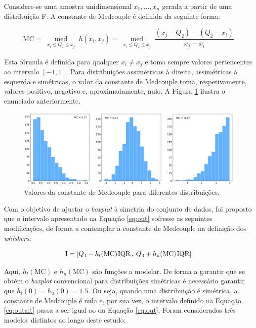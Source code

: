 Considere-se uma amostra unidimensional ${x_1, \dots, x_n}$ gerada a partir de uma distribuição F. A constante de Medcouple é definida da seguinte forma:


\begin{equation}
	\text{MC} = \operatorname*{med}_{\substack{x_i \leq Q_2 \leq x_j}} h(x_i, x_j) = \operatorname*{med}_{\substack{x_i \leq Q_2 \leq x_j}} \frac{(x_j - Q_2) - (Q_2 - x_i)}{x_j - x_i}
\end{equation}

Esta fórmula é definida para qualquer $x_i \neq x_j$ e toma sempre valores pertencentes ao intervalo $[-1,1]$. Para distribuições assimétricas à direita, assimétricas à esquerda e simétricas, o valor da constante de Medcouple toma, respetivamente, valores positivo, negativo e, aproximadamente, nulo. A Figura \ref{fig:histmc} ilustra o enunciado anteriormente.

\begin{figure}[H]
	\centering
	\includegraphics[width=\textwidth]{imagens/stats/histos_mc.png}
	\caption{Valores da constante de Medcouple para diferentes distribuições.}
	\label{fig:histmc}
\end{figure}


Com o objetivo de ajustar o \textit{boxplot} à simetria do conjunto de dados, foi proposto que o intervalo apresentado na Equação \ref{eq:out} sofresse as seguintes modificações, de forma a contemplar a constante de Medcouple na definição dos \textit{whiskers}:


\begin{equation}
	\text{I} = [Q_1 - h_l(\text{MC}) \hspace{1px} \text{IQR} \hspace{2px} , \hspace{2px} Q_3 + h_u(\text{MC}) \hspace{1px} \text{IQR}]
	\label{eq:outalt}
\end{equation}


Aqui, $h_l(\text{MC})$ e $h_u(\text{MC})$ são funções a modelar. De forma a garantir que se obtém o \textit{boxplot} convencional para distribuições simétricas é necessário garantir que $h_l(0) = h_u(0) = 1.5$. Ou seja, quando uma distribuição é simétrica, a constante de Medcouple é nula e, por sua vez, o intervalo definido na Equação \ref{eq:outalt} passa a ser igual ao da Equação \ref{eq:out}. Foram considerados três modelos distintos ao longo deste estudo:

